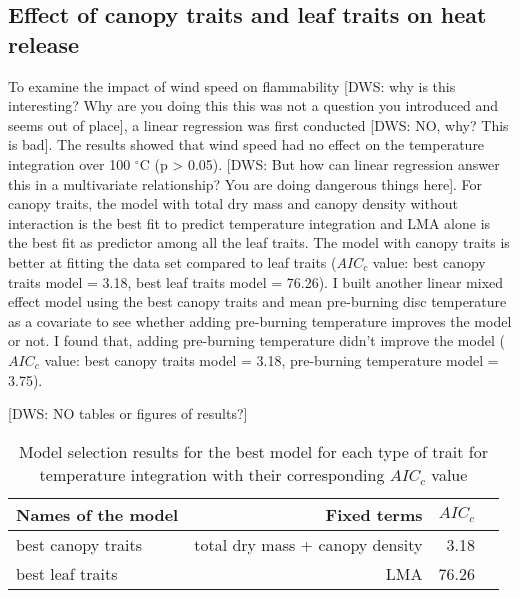 \documentclass[12pt]{report}
\begin{document}
\subsection{Effect of canopy traits and leaf traits on heat release}
To examine the impact of wind speed on flammability [DWS: why is this interesting? Why are you doing this this was not a question you introduced and seems out of place], a linear regression was first conducted [DWS: NO, why? This is bad]. The results showed that wind speed had no effect on the temperature integration over 100 $^{\circ}$C (p > 0.05). [DWS: But how can linear regression answer this in a multivariate relationship? You are doing dangerous things here]. For canopy traits, the model with total dry mass and canopy density without interaction is the best fit to predict temperature integration and \MakeUppercase{lma} alone is the best fit as predictor among all the leaf traits. The model with canopy traits is better at fitting the data set compared to leaf traits ($AIC_{c}$ value: best canopy traits model = 3.18, best leaf traits model = 76.26). I built another linear mixed effect model using the best canopy traits and mean pre-burning disc temperature as a covariate to see whether adding pre-burning temperature improves the model or not. I found that, adding pre-burning temperature didn't improve the model ($AIC_{c}$ value: best canopy traits model = 3.18, pre-burning temperature model = 3.75).


[DWS: NO tables or figures of results?]


\begin{table}
\centering
\begin{tabular}{lrrr}
       \hline
       \textbf{ Names of the model} & \textbf{ Fixed terms} & \textbf{$AIC_{c}$} \\
       \hline
        best canopy traits  & total dry mass + canopy density &  3.18 \\
       \hline
        best leaf traits    & LMA & 76.26 \\
       \hline
\end{tabular}
\caption{Model selection results for the best model for each type of trait for temperature integration with their corresponding $AIC_{c}$ value}
\end{table} 
\end{document}
